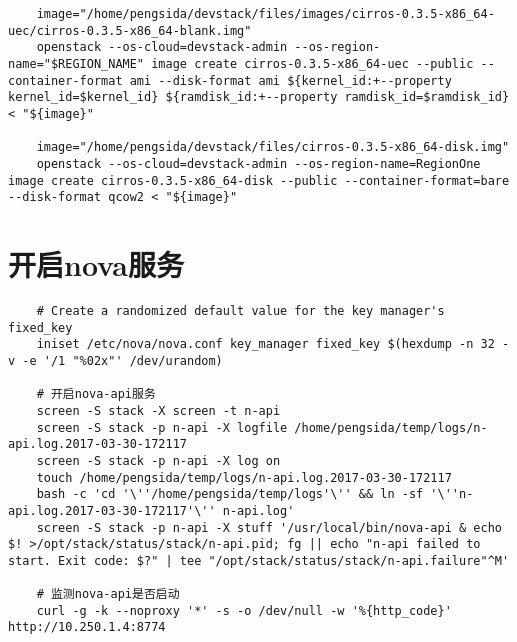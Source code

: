 \documentclass[a4paper,left=1.5cm,right=1.5cm,11pt]{article}
\begin{document}
\begin{lstlisting}
	image="/home/pengsida/devstack/files/images/cirros-0.3.5-x86_64-uec/cirros-0.3.5-x86_64-blank.img"
	openstack --os-cloud=devstack-admin --os-region-name="$REGION_NAME" image create cirros-0.3.5-x86_64-uec --public --container-format ami --disk-format ami ${kernel_id:+--property kernel_id=$kernel_id} ${ramdisk_id:+--property ramdisk_id=$ramdisk_id} < "${image}"

	image="/home/pengsida/devstack/files/cirros-0.3.5-x86_64-disk.img"
	openstack --os-cloud=devstack-admin --os-region-name=RegionOne image create cirros-0.3.5-x86_64-disk --public --container-format=bare --disk-format qcow2 < "${image}"
	\end{lstlisting}

\section{开启nova服务}
	\begin{lstlisting}
	# Create a randomized default value for the key manager's fixed_key
	iniset /etc/nova/nova.conf key_manager fixed_key $(hexdump -n 32 -v -e '/1 "%02x"' /dev/urandom)

	# 开启nova-api服务
	screen -S stack -X screen -t n-api
	screen -S stack -p n-api -X logfile /home/pengsida/temp/logs/n-api.log.2017-03-30-172117
    screen -S stack -p n-api -X log on
	touch /home/pengsida/temp/logs/n-api.log.2017-03-30-172117
    bash -c 'cd '\''/home/pengsida/temp/logs'\'' && ln -sf '\''n-api.log.2017-03-30-172117'\'' n-api.log'
	screen -S stack -p n-api -X stuff '/usr/local/bin/nova-api & echo $! >/opt/stack/status/stack/n-api.pid; fg || echo "n-api failed to start. Exit code: $?" | tee "/opt/stack/status/stack/n-api.failure"^M'

	# 监测nova-api是否启动
	curl -g -k --noproxy '*' -s -o /dev/null -w '%{http_code}' http://10.250.1.4:8774
	\end{lstlisting}
\end{document}
